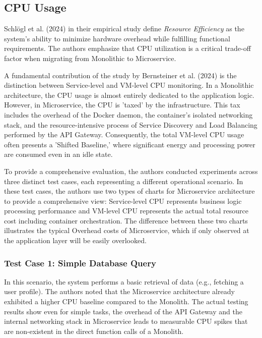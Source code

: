 \subsection{CPU Usage}

Schlögl et al. (2024) in their empirical study \cite{Schloegl2024} define \textit{Resource Efficiency} as the system's ability to minimize hardware overhead while fulfilling functional requirements. The authors emphasize that CPU utilization is a critical trade-off factor when migrating from Monolithic to Microservice. 

A fundamental contribution of the study by Bernsteiner et al. (2024) is the distinction between Service-level and VM-level CPU monitoring. In a Monolithic architecture, the CPU usage is almost entirely dedicated to the application logic. However, in Microservice, the CPU is 'taxed' by the infrastructure. This tax includes the overhead of the Docker daemon, the container's isolated networking stack, and the resource-intensive process of Service Discovery and Load Balancing performed by the API Gateway. Consequently, the total VM-level CPU usage often presents a 'Shifted Baseline,' where significant energy and processing power are consumed even in an idle state.

To provide a comprehensive evaluation, the authors conducted experiments across three distinct test cases, each representing a different operational scenario.
In these test cases, the authors use two types of charts for Microservice architecture to provide a comprehensive view: Service-level 
CPU represents business logic processing performance and VM-level CPU represents the actual total resource cost 
including container orchestration. The difference between these two charts illustrates the typical Overhead 
costs of Microservice, which if only observed at the application layer will be easily overlooked.

\subsubsection{Test Case 1: Simple Database Query}
In this scenario, the system performs a basic retrieval of data (e.g., fetching a user profile). The authors noted that 
the Microservice architecture already exhibited a higher CPU baseline compared to the Monolith.
The actual testing results show even for simple tasks, the overhead of the API Gateway and the internal 
networking stack in Microservice leads to measurable CPU spikes that are non-existent in 
the direct function calls of a Monolith.

